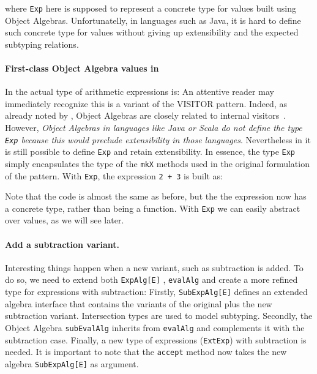 \noindent where \lstinline{Exp} here is supposed to represent a
concrete type for values built using Object Algebras. Unfortunatelly, in languages
such as Java, it is hard to define such concrete type for values
without giving up extensibility and the expected subtyping  relations.

\paragraph{First-class Object Algebra values in \name}
In \name the actual type of arithmetic expressions is:
An attentive reader may immediately recognize this is a variant of the VISITOR
pattern. Indeed, as already noted by \citet{oliveira2012extensibility}, Object
Algebras are closely related to internal visitors~\cite{}. However, \emph{Object
Algebras in languages like Java or Scala do not define the type
\lstinline{Exp} because this would preclude extensibility in those
languages}. Nevertheless in \name it is still possible to define
\lstinline{Exp} and retain extensibility. In essence, the type
\lstinline{Exp} simply encapsulates the type
of the \lstinline{mkX} methods used in the original formulation of the
pattern. With \lstinline{Exp}, the expression \lstinline{2 + 3} is
built as:


\noindent Note that the code is almost the same as before, but the the
expression now has a concrete type, rather than being a function. With
\lstinline{Exp} we can easily abstract over values, as we will see later.



\paragraph{Add a subtraction variant.} Interesting things happen when a new
variant, such as subtraction is added. To do so, we need to extend both
\lstinline{ExpAlg[E]} , \lstinline{evalAlg} and create a more refined
type for expressions with subtraction:
Firstly, \lstinline{SubExpAlg[E]} defines an extended algebra interface that contains the
variants of the original plus the new subtraction variant. Intersection types
are used to model subtyping. Secondly, the Object Algebra
\lstinline{subEvalAlg} inherits from \lstinline{evalAlg} and
complements it with the subtraction case.
Finally, a new type of expressions
(\lstinline{ExtExp}) with subtraction is needed. It is important to note that
the \lstinline{accept} method now takes the new algebra \lstinline{SubExpAlg[E]}
as argument.

